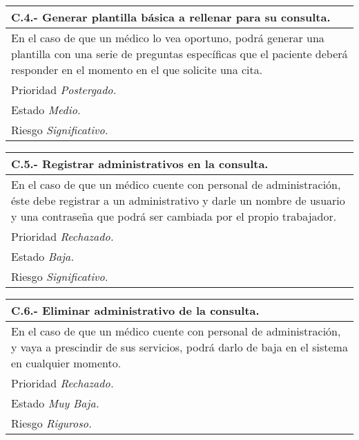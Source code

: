 	\begin{center}
	\begin{tabulary}{15cm}{|L|}
		\hline
			\bf{C.4.- Generar plantilla básica a rellenar para su consulta.} \\
		\hline
			En el caso de que un médico lo vea oportuno, podrá generar una plantilla con una serie de preguntas específicas que el paciente deberá responder en el momento en el que solicite una cita. \\
		\hline
			Prioridad \textit{Postergado.} \\
		\hline
			Estado \textit{Medio.} \\
		\hline
			Riesgo \textit{Significativo.} \\
		\hline
	\end{tabulary}
	\end{center}

	\begin{center}
	\begin{tabulary}{15cm}{|L|}
		\hline
			\bf{C.5.- Registrar administrativos en la consulta.} \\
		\hline
			En el caso de que un médico cuente con personal de administración, éste debe registrar a un administrativo y darle un nombre de usuario y una contraseña que podrá ser cambiada por el propio trabajador. \\
		\hline
			Prioridad \textit{Rechazado.} \\
		\hline
			Estado \textit{Baja.} \\
		\hline
			Riesgo \textit{Significativo.} \\
		\hline
	\end{tabulary}
	\end{center}

	\begin{center}
	\begin{tabulary}{15cm}{|L|}
		\hline
			\bf{C.6.- Eliminar administrativo de la consulta.} \\
		\hline
			En el caso de que un médico cuente con personal de administración, y vaya a prescindir de sus servicios, podrá darlo de baja en el sistema en cualquier momento. \\
		\hline
			Prioridad \textit{Rechazado.} \\
		\hline
			Estado \textit{Muy Baja.} \\
		\hline
			Riesgo \textit{Riguroso.} \\
		\hline
	\end{tabulary}
	\end{center}

